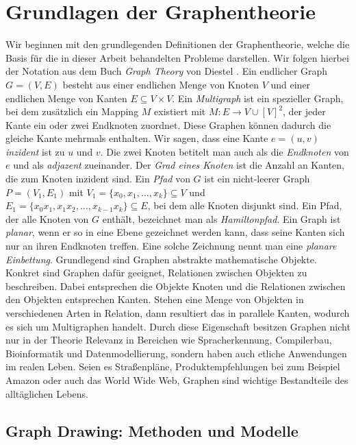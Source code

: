 \documentclass[bachelor, german]{algothesis}
\begin{document}
\section{Grundlagen der Graphentheorie}
Wir beginnen mit den grundlegenden Definitionen der Graphentheorie, welche die Basis für die in dieser Arbeit behandelten Probleme darstellen. Wir folgen hierbei der Notation aus dem Buch \textit{Graph Theory} von Diestel \cite{GraohTh}. Ein endlicher Graph $G = (V,E)$ besteht aus einer endlichen Menge von Knoten $V$ und einer endlichen Menge von Kanten $E \subseteq V \times V$. Ein \textit{Multigraph} ist ein spezieller Graph, bei dem zusätzlich ein Mapping $M$ existiert mit $M: E \rightarrow V \cup [V]^2$, der jeder Kante ein oder zwei Endknoten zuordnet. Diese Graphen können dadurch die gleiche Kante mehrmals enthalten. Wir sagen, dass eine Kante $e = (u,v)$ \textit{inzident} ist zu $u$ und $v$. Die zwei Knoten betitelt man auch als die \textit{Endknoten} von $e$ und als \textit{adjazent} zueinander. Der \textit{Grad eines Knoten} ist die Anzahl an Kanten, die zum Knoten inzident sind. \newline
Ein \textit{Pfad} von $G$ ist ein nicht-leerer Graph $P = (V_1,E_1)$ mit  $V_1 = \{x_0,x_1,\dots, x_k\} \subseteq V$ und $E_1 = \{x_0x_1,x_1x_2,\dots,x_{k-1}x_k\} \subseteq E$, bei dem alle Knoten disjunkt sind. Ein Pfad, der alle Knoten von $G$ enthält, bezeichnet man als \textit{Hamiltonpfad}.\newline
Ein Graph ist \textit{planar}, wenn er so in eine Ebene gezeichnet werden kann, dass seine Kanten sich nur an ihren Endknoten treffen. Eine solche Zeichnung nennt man eine \textit{planare Einbettung}. \newline
Grundlegend sind Graphen abstrakte mathematische Objekte.
Konkret sind Graphen dafür geeignet, Relationen zwischen Objekten zu beschreiben. Dabei entsprechen die Objekte Knoten und die Relationen zwischen den Objekten entsprechen Kanten. Stehen eine Menge von Objekten in verschiedenen Arten in Relation, dann resultiert das in parallele Kanten, wodurch es sich um Multigraphen handelt. Durch diese Eigenschaft besitzen Graphen nicht nur in der Theorie Relevanz in Bereichen wie Spracherkennung, Compilerbau, Bioinformatik und Datenmodellierung, sondern haben auch etliche Anwendungen im realen Leben. Seien es Straßenpläne, Produktempfehlungen bei zum Beispiel Amazon oder auch das World Wide Web, Graphen sind wichtige Bestandteile des alltäglichen Lebens\cite{DrawingMeth}.

\subsection{Graph Drawing: Methoden und Modelle}
\end{document}
